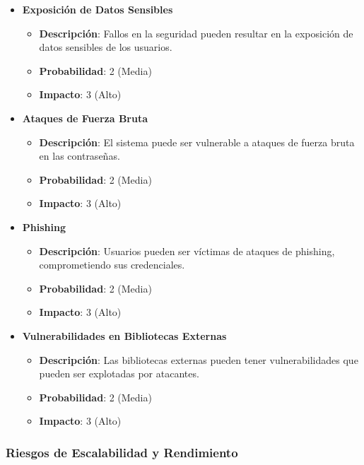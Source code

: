 \begin{itemize}
    \item \textbf{Exposición de Datos Sensibles}
          \begin{itemize}
              \item \textbf{Descripción}: Fallos en la seguridad pueden resultar en la exposición de datos sensibles de los usuarios.
              \item \textbf{Probabilidad}: 2 (Media)
              \item \textbf{Impacto}: 3 (Alto)
          \end{itemize}

    \item \textbf{Ataques de Fuerza Bruta}
          \begin{itemize}
              \item \textbf{Descripción}: El sistema puede ser vulnerable a ataques de fuerza bruta en las contraseñas.
              \item \textbf{Probabilidad}: 2 (Media)
              \item \textbf{Impacto}: 3 (Alto)
          \end{itemize}

    \item \textbf{Phishing}
          \begin{itemize}
              \item \textbf{Descripción}: Usuarios pueden ser víctimas de ataques de phishing, comprometiendo sus credenciales.
              \item \textbf{Probabilidad}: 2 (Media)
              \item \textbf{Impacto}: 3 (Alto)
          \end{itemize}

    \item \textbf{Vulnerabilidades en Bibliotecas Externas}
          \begin{itemize}
              \item \textbf{Descripción}: Las bibliotecas externas pueden tener vulnerabilidades que pueden ser explotadas por atacantes.
              \item \textbf{Probabilidad}: 2 (Media)
              \item \textbf{Impacto}: 3 (Alto)
          \end{itemize}
\end{itemize}

\subsubsection{Riesgos de Escalabilidad y Rendimiento}


